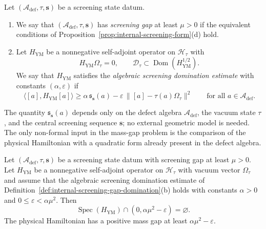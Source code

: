 \begin{definition}
\label{def:internal-screening-gap-domination}
Let $(\mathcal A_{\mathrm{def}},\tau,\mathbf s)$ be a screening state datum.
\begin{enumerate}[label=(\alph*)]
\item We say that $(\mathcal A_{\mathrm{def}},\tau,\mathbf s)$ has \emph{screening gap} at least $\mu>0$
if the equivalent conditions of Proposition~\ref{prop:internal-screening-form}(d) hold.
\item Let $H_{\mathrm{YM}}$ be a nonnegative self-adjoint operator on $\mathcal H_\tau$ with
\[
H_{\mathrm{YM}}\Omega_\tau=0,
\qquad
\mathcal D_\tau\subset \operatorname{Dom}(H_{\mathrm{YM}}^{1/2}).
\]
We say that $H_{\mathrm{YM}}$ satisfies the \emph{algebraic screening domination estimate}
with constants $(\alpha,\varepsilon)$ if
\[
\bigl\langle [a],H_{\mathrm{YM}}[a]\bigr\rangle
\ge
\alpha\,\mathfrak s_{\mathbf s}(a)
-\varepsilon\,\bigl\|[a]-\tau(a)\Omega_\tau\bigr\|^2
\qquad\text{for all }a\in \mathcal A_{\mathrm{def}}.
\]
\end{enumerate}
\end{definition}

\begin{remark}
\label{rem:why-screening-estimate-is-internal}
The quantity $\mathfrak s_{\mathbf s}(a)$ depends only on the defect algebra $\mathcal A_{\mathrm{def}}$, the vacuum state $\tau$,
and the central screening sequence $\mathbf s$; no external geometric model is needed.
The only non-formal input in the mass-gap problem is the comparison of the physical
Hamiltonian with a quadratic form already present in the defect algebra.
\end{remark}

\begin{theorem}
\label{thm:mass-gap-reduction-internal-screening}
Let $(\mathcal A_{\mathrm{def}},\tau,\mathbf s)$ be a screening state datum with screening gap at least $\mu>0$.
Let $H_{\mathrm{YM}}$ be a nonnegative self-adjoint operator on $\mathcal H_\tau$ with vacuum vector
$\Omega_\tau$ and assume that the algebraic screening domination estimate of
Definition~\ref{def:internal-screening-gap-domination}(b) holds with constants $\alpha>0$ and
$0\le \varepsilon<\alpha\mu^2$.
Then
\[
\operatorname{Spec}(H_{\mathrm{YM}})\cap (0,\alpha\mu^2-\varepsilon)=\varnothing.
\]
The physical Hamiltonian has a positive mass gap at least $\alpha\mu^2-\varepsilon$.
\end{theorem}

